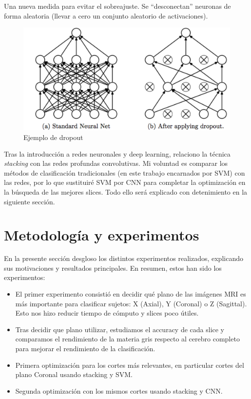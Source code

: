 \begin{itemize}
\begin{itemize}
	Una nueva medida para evitar el sobreajuste. Se ``desconectan'' neuronas de forma aleatoria (llevar a cero un conjunto aleatorio de activaciones). 
						
		\begin{figure}[H] %
		\centering
		\includegraphics[scale=0.3]{dropout.png}  %
		\caption{Ejemplo de dropout} 
		\label{fig:drop}
	\end{figure}				
\end{itemize}

 
\end{itemize}

Tras la introducción a redes neuronales y deep learning, relaciono la técnica \textit{stacking} con las redes profundas convolutivas. Mi voluntad es comparar los métodos de clasificación tradicionales (en este trabajo encarnados por SVM) con las redes, por lo que sustituiré SVM por CNN para completar la optimización en la búsqueda de las mejores slices. Todo ello será explicado con detenimiento en la siguiente sección.

\newpage 

\section{Metodología y experimentos}

En la presente sección desgloso los distintos experimentos realizados, explicando sus motivaciones y resultados principales. En resumen, estos han sido los experimentos:

\begin{itemize}
	\item El primer experimento consistió en decidir qué plano de las imágenes MRI es más importante para clasificar sujetos: X (Axial), Y (Coronal) o Z (Sagittal). Esto nos hizo reducir tiempo de cómputo y slices poco útiles.
	\item Tras decidir que plano utilizar, estudiamos el accuracy de cada slice y comparamos el rendimiento de la materia gris respecto al cerebro completo para mejorar el rendimiento de la clasificación.
	\item Primera optimización para los cortes más relevantes, en particular cortes del plano Coronal usando stacking y SVM.
	\item Segunda optimización con los mismos cortes usando stacking y CNN.
\end{itemize}


